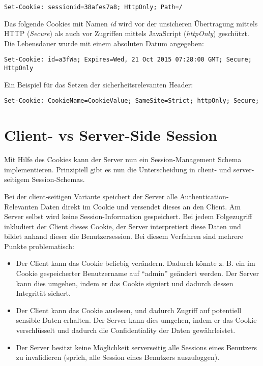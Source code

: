 \begin{verbatim}
Set-Cookie: sessionid=38afes7a8; HttpOnly; Path=/
\end{verbatim}

Das folgende Cookies mit Namen \textit{id} wird vor der unsicheren Übertragung mittels HTTP (\textit{Secure}) als auch vor Zugriffen mittels JavaScript (\textit{httpOnly}) geschützt. Die Lebensdauer wurde mit einem absoluten Datum angegeben:

\begin{verbatim}
Set-Cookie: id=a3fWa; Expires=Wed, 21 Oct 2015 07:28:00 GMT; Secure; HttpOnly
\end{verbatim}

Ein Beispiel für das Setzen der sicherheitsrelevanten Header:

\begin{verbatim}
Set-Cookie: CookieName=CookieValue; SameSite=Strict; httpOnly; Secure;
\end{verbatim}

\section{Client- vs Server-Side Session}

Mit Hilfe des Cookies kann der Server nun ein Session-Management Schema implementieren. Prinzipiell gibt es nun die Unterscheidung in client- und server-seitigem Session-Schemas.

Bei der client-seitigen Variante speichert der Server alle Authentication-Relevanten Daten direkt im Cookie und versendet dieses an den Client. Am Server selbst wird keine Session-Information gespeichert. Bei jedem Folgezugriff inkludiert der Client dieses Cookie, der Server interpretiert diese Daten und bildet anhand dieser die Benutzersession. Bei diesem Verfahren sind mehrere Punkte problematisch:

\begin{itemize}
		\item Der Client kann das Cookie beliebig verändern. Dadurch könnte z. B. ein im Cookie gespeicherter Benutzername auf ``admin'' geändert werden. Der Server kann dies umgehen, indem er das Cookie signiert und dadurch dessen Integrität sichert.
	\item Der Client kann das Cookie auslesen, und dadurch Zugriff auf potentiell sensible Daten erhalten. Der Server kann dies umgehen, indem er das Cookie verschlüsselt und dadurch die Confidentiality der Daten gewährleistet.
	\item Der Server besitzt keine Möglichkeit serverseitig alle Sessions eines Benutzers zu invalidieren (sprich, alle Session eines Benutzers auszuloggen).
\end{itemize}

